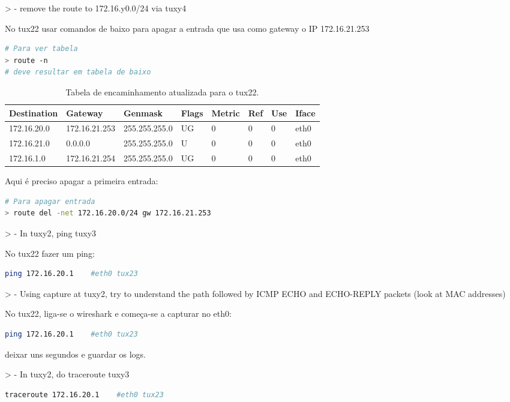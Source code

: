 > - remove the route to 172.16.y0.0/24 via tuxy4

No tux22 usar comandos de baixo para apagar a entrada que usa como gateway o IP 172.16.21.253

\begin{lstlisting}[language=bash]
# Para ver tabela
> route -n
# deve resultar em tabela de baixo
\end{lstlisting}

\begin{table}[h!]
    \centering
    \begin{tabular}{|l|l|l|l|l|l|l|l|}
    \hline
        Destination & Gateway & Genmask & Flags & Metric & Ref & Use & Iface \\ \hline
        172.16.20.0 & 172.16.21.253 & 255.255.255.0 & UG & 0 & 0 & 0 & eth0 \\ \hline
        172.16.21.0 & 0.0.0.0 & 255.255.255.0 & U & 0 & 0 & 0 & eth0 \\ \hline
        172.16.1.0 & 172.16.21.254 & 255.255.255.0 & UG & 0 & 0 & 0 & eth0 \\ \hline
    \end{tabular}
    \caption{\label{tab:table-name}Tabela de encaminhamento atualizada para o tux22.}
\end{table}

Aqui é preciso apagar a primeira entrada:
\begin{lstlisting}[language=bash]
# Para apagar entrada
> route del -net 172.16.20.0/24 gw 172.16.21.253
\end{lstlisting}

> - In tuxy2, ping  tuxy3

No tux22 fazer um ping:
\begin{lstlisting}[language=bash]
ping 172.16.20.1    #eth0 tux23
\end{lstlisting}

> - Using capture at tuxy2, try to understand the path followed by ICMP ECHO and  ECHO-REPLY packets  (look at MAC addresses)

No tux22, liga-se o wireshark e começa-se a capturar no eth0:
\begin{lstlisting}[language=bash]
ping 172.16.20.1    #eth0 tux23
\end{lstlisting}

deixar uns segundos e guardar os logs.

> - In tuxy2, do traceroute tuxy3

\begin{lstlisting}[language=bash]
traceroute 172.16.20.1    #eth0 tux23
\end{lstlisting}

